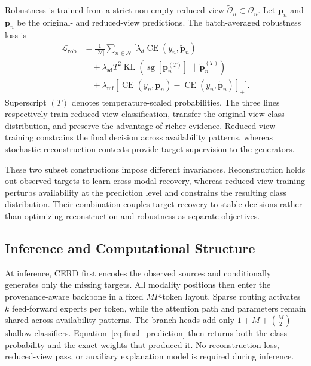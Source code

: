 \documentclass[a4paper,fleqn]{cas-dc}
\begin{document}
Robustness is trained from a strict non-empty reduced view \(\widetilde{\mathcal O}_n\subset\mathcal O_n\). Let \(\mathbf p_n\) and \(\widetilde{\mathbf p}_n\) be the original- and reduced-view predictions. The batch-averaged robustness loss is
\begin{equation}
\begin{aligned}
\mathcal L_{\mathrm{rob}}
&=\frac{1}{|\mathcal N|}\sum_{n\in\mathcal N}\Big[
\lambda_d\operatorname{CE}(y_n,\widetilde{\mathbf p}_n)\\
&\quad+\lambda_{\mathrm{sd}}T^2\operatorname{KL}\!\left(
\operatorname{sg}[\mathbf p_n^{(T)}]\,\|\,\widetilde{\mathbf p}_n^{(T)}\right)\\
&\quad+\lambda_{\mathrm{mf}}\left[
\operatorname{CE}(y_n,\mathbf p_n)-
\operatorname{CE}(y_n,\widetilde{\mathbf p}_n)
\right]_+\Big].
\end{aligned}
\label{eq:robust_objective}
\end{equation}
Superscript \((T)\) denotes temperature-scaled probabilities. The three lines respectively train reduced-view classification, transfer the original-view class distribution, and preserve the advantage of richer evidence. Reduced-view training constrains the final decision across availability patterns, whereas stochastic reconstruction contexts provide target supervision to the generators.

These two subset constructions impose different invariances. Reconstruction holds out observed targets to learn cross-modal recovery, whereas reduced-view training perturbs availability at the prediction level and constrains the resulting class distribution. Their combination couples target recovery to stable decisions rather than optimizing reconstruction and robustness as separate objectives.

\subsection{Inference and Computational Structure}
\label{sec:inference}

At inference, CERD first encodes the observed sources and conditionally generates only the missing targets. All modality positions then enter the provenance-aware backbone in a fixed \(MP\)-token layout. Sparse routing activates \(k\) feed-forward experts per token, while the attention path and parameters remain shared across availability patterns. The branch heads add only \(1+M+\binom{M}{2}\) shallow classifiers. Equation~\eqref{eq:final_prediction} then returns both the class probability and the exact weights that produced it. No reconstruction loss, reduced-view pass, or auxiliary explanation model is required during inference.
\end{document}
